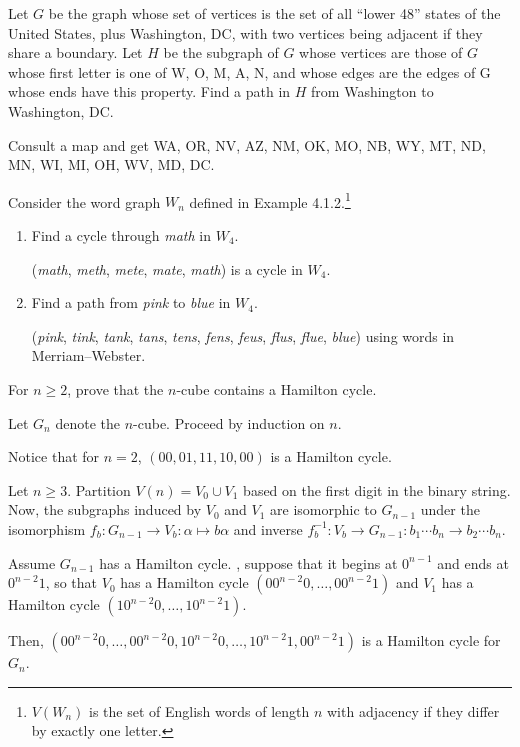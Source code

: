 \setcounter{xca}{3} %

\begin{xca}
  Let $G$ be the graph whose set of vertices is the set of all
  ``lower 48'' states of the United States, plus Washington, DC,
  with two vertices being adjacent if they share a boundary.
  Let $H$ be the subgraph of $G$ whose vertices are those of $G$
  whose first letter is one of W, O, M, A, N,
  and whose edges are the edges of G whose ends have this property.
  Find a path in $H$ from Washington to Washington, DC.
\end{xca}
\begin{sol}
  Consult a map and get WA, OR, NV, AZ, NM, OK, MO, NB, WY, MT, ND, MN, WI, MI, OH, WV, MD, DC.
\end{sol}

\begin{xca}
  Consider the word graph $W_n$ defined in Example 4.1.2.\footnote{
    $V(W_n)$ is the set of English words of length $n$
    with adjacency if they differ by exactly one letter.}
\end{xca}
\begin{enumerate}
  \item Find a cycle through \emph{math} in $W_4$.
        \begin{sol}
          (\emph{math}, \emph{meth}, \emph{mete}, \emph{mate}, \emph{math})
          is a cycle in $W_4$.
        \end{sol}
  \item Find a path from \emph{pink} to \emph{blue} in $W_4$.
        \begin{sol}
          (\emph{pink}, \emph{tink}, \emph{tank}, \emph{tans}, \emph{tens}, \emph{fens}, \emph{feus}, \emph{flus}, \emph{flue}, \emph{blue})
          using words in Merriam--Webster.
        \end{sol}
\end{enumerate}

\begin{xca}
  For $n \geq 2$, prove that the $n$-cube contains a Hamilton cycle.
\end{xca}
\begin{prf}
  Let $G_n$ denote the $n$-cube. Proceed by induction on $n$.

  Notice that for $n = 2$, $(00,01,11,10,00)$ is a Hamilton cycle.

  Let $n \geq 3$.
  Partition $V(n) = V_0 \cup V_1$ based on the first digit in the binary string.
  Now, the subgraphs induced by $V_0$ and $V_1$ are isomorphic to $G_{n-1}$
  under the isomorphism $f_b : G_{n-1} \to V_b : \alpha \mapsto b\alpha$
  and inverse $f^{-1}_b : V_b \to G_{n-1} : b_1\cdots b_n \to b_2 \cdots b_n$.

  Assume $G_{n-1}$ has a Hamilton cycle.
  \WLOG, suppose that it begins at $0^{n-1}$ and ends at $0^{n-2}1$,
  so that $V_0$ has a Hamilton cycle $(00^{n-2}0, \dotsc, 00^{n-2}1)$
  and $V_1$ has a Hamilton cycle $(10^{n-2}0, \dotsc, 10^{n-2}1)$.

  Then, $(00^{n-2}0, \dotsc, 00^{n-2}0, 10^{n-2}0, \dotsc, 10^{n-2}1, 00^{n-2}1)$
  is a Hamilton cycle for $G_n$.
\end{prf}

